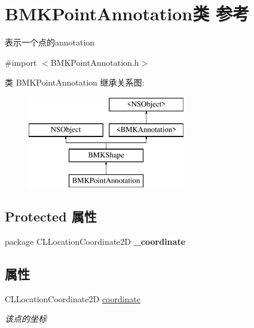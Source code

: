 \hypertarget{interface_b_m_k_point_annotation}{}\section{B\+M\+K\+Point\+Annotation类 参考}
\label{interface_b_m_k_point_annotation}


表示一个点的annotation  




{\ttfamily \#import $<$B\+M\+K\+Point\+Annotation.\+h$>$}

类 B\+M\+K\+Point\+Annotation 继承关系图\+:\begin{figure}[H]
\begin{center}
\leavevmode
\includegraphics[height=4.000000cm]{interface_b_m_k_point_annotation}
\end{center}
\end{figure}
\subsection*{Protected 属性}
\begin{DoxyCompactItemize}
\item 
\hypertarget{interface_b_m_k_point_annotation_affd501bbf19fb485a6bd7e0e49c9a144}{}package C\+L\+Location\+Coordinate2\+D {\bfseries \+\_\+coordinate}\label{interface_b_m_k_point_annotation_affd501bbf19fb485a6bd7e0e49c9a144}

\end{DoxyCompactItemize}
\subsection*{属性}
\begin{DoxyCompactItemize}
\item 
\hypertarget{interface_b_m_k_point_annotation_a4434c998ea13f0c029eb944312611091}{}C\+L\+Location\+Coordinate2\+D \hyperlink{interface_b_m_k_point_annotation_a4434c998ea13f0c029eb944312611091}{coordinate}\label{interface_b_m_k_point_annotation_a4434c998ea13f0c029eb944312611091}

\begin{DoxyCompactList}\small\item\em 该点的坐标 \end{DoxyCompactList}\end{DoxyCompactItemize}
